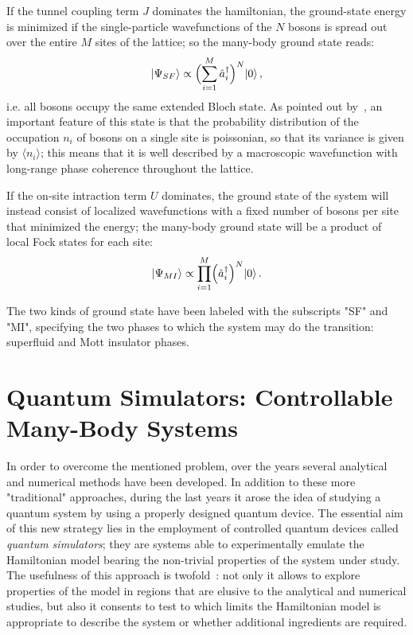 If the tunnel coupling term $J$ dominates the hamiltonian, the ground-state energy is minimized if the single-particle wavefunctions of the $N$ bosons is spread out over the entire $M$ sites of the lattice; so the many-body ground state reads:
\begin{equation*}
    \ket{\Psi_{SF}} \propto \Bigl( \sum_{i=1}^M \hat{a}^{\dagger}_i \Bigl)^N \ket{0},
\end{equation*}
i.e. all bosons occupy the same extended Bloch state. As pointed out by~\cite{Greiner_bose_hubbard}, an important feature of this state is that the probability distribution of the occupation $n_i$ of bosons on a single site is poissonian, so that its variance is given by $\langle n_i \rangle$; this means that it is well described by a macroscopic wavefunction with long-range phase coherence throughout the lattice.

If the on-site intraction term $U$ dominates, the ground state of the system will instead consist of localized wavefunctions with a fixed number of bosons per site that minimized the energy; the many-body ground state will be a product of local Fock states for each site:
\begin{equation*}
    \ket{\Psi_{MI}} \propto \prod_{i=1}^M \Bigl( \hat{a}^{\dagger}_i\Bigl)^N \ket{0}.
\end{equation*}

The two kinds of ground state have been labeled with the subscripts "SF" and "MI", specifying the two phases to which the system may do the transition: superfluid and Mott insulator phases.


\section{Quantum Simulators: Controllable Many-Body Systems}
In order to overcome the mentioned problem, over the years several analytical and numerical methods have been developed. In addition to these more "traditional" approaches, during the last years it arose the idea of studying a quantum system by using a properly designed quantum device. The essential aim of this new strategy lies in the employment of controlled quantum devices called \emph{quantum simulators}; they are systems able to experimentally emulate the Hamiltonian model bearing the non-trivial properties of the system under study. The usefulness of this approach is twofold~\cite{Tomadin_Fazio}:  not only it allows to explore properties of the model in regions that are elusive to the analytical and numerical studies, but also it consents to test to which limits the Hamiltonian model is appropriate to describe the system or whether additional ingredients are required.

